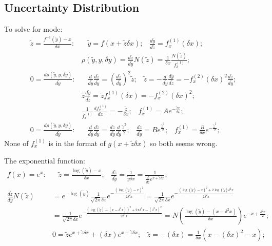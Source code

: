 \documentclass[twoside]{article}
\numberwithin{equation}{section}
\newcommand{\eqspace}{\;\;\;}
\begin{document}
\subsection{Uncertainty Distribution}

\iffalse

To solve for mode:
\begin{align*}
\tilde{z} = \frac{f^{-1}(\tilde{y}) - x}{\delta x}:& \eqspace 
 \tilde{y} = f(x + \tilde{z} \delta x); \eqspace
 \frac{d \tilde{y}}{d \tilde{z}} = f_x^{(1)} (\delta x); \\
& \rho(\tilde{y}, y, \delta y) = \frac{d \tilde{z}}{d \tilde{y}} N(\tilde{z})
 = \frac{1}{\delta x} \frac{N(\tilde{z})}{f_x^{(1)}};  \\
0 = \frac{d \rho(\tilde{y}, y, \delta y)}{d \tilde{y}}: & \eqspace
 \frac{d}{d \tilde{y}} \frac{d \tilde{z}}{d \tilde{y}} = (\frac{d \tilde{z}}{d \tilde{y}})^2 \tilde{z}; \eqspace
 \tilde{z} = - \frac{d}{d \tilde{y}} \frac{d \tilde{y}}{d \tilde{z}}
  = - f_x^{(2)} (\delta x)^2 \frac{d \tilde{z}}{d \tilde{y}}; \\
& \tilde{z} \frac{d \tilde{y}}{d \tilde{z}} = \tilde{z} f_x^{(1)} (\delta x) = - f_x^{(2)} (\delta x)^2; \\
& \frac{1}{f_x^{(1)}} \frac{d f_x^{(1)}}{dx} = - \frac{\tilde{z}}{\delta x}; \eqspace 
 f_x^{(1)} = A e^{- \frac{\tilde{z} x}{\delta x}}; \\
0 = \frac{d \rho(\tilde{y}, y, \delta y)}{d \tilde{y}}:& \eqspace \frac{d}{d \tilde{y}} \frac{d \tilde{z}}{d \tilde{y}}
   = \frac{d \tilde{z}}{d \tilde{y}} \frac{d}{d \tilde{y}} \frac{\tilde{z}^2}{2}; \eqspace
 \frac{d \tilde{z}}{d \tilde{y}} = B e^{\frac{\tilde{z}^2}{2}}; \eqspace
 f_x^{(1)} = \frac{B}{\delta x} e^{-\frac{\tilde{z}^2}{2}};
\end{align*}
None of $f_x^{(1)}$ is in the format of $g(x + \tilde{z} \delta x)$ so both seems wrong.

The exponential function:
\begin{align*}
f(x) = e^x:& \eqspace 
\tilde{z} = \frac{\log(\tilde{y}) - x}{\delta x}, \eqspace 
\frac{d \tilde{z}}{d \tilde{y}} = \frac{1}{\tilde{y} \delta x} = \frac{1}{\frac{d}{d \tilde{z}} e^{x + \tilde{z} \delta x}}; \eqspace \\
\frac{d \tilde{z}}{d \tilde{y}} N(\tilde{z})
&= e^{-\log(\tilde{y})} \frac{1}{\sqrt{2\pi} \delta x} e^{-\frac{(\log(\tilde{y}) - x)^2}{2 \delta^2 x}}
 = \frac{1}{\sqrt{2\pi} \delta x} e^{-\frac{(\log(\tilde{y}) - x)^2 + 2 \log(\tilde{y}) \delta^2 x }{2 \delta^2 x}} \\
& = \frac{1}{\sqrt{2\pi} \delta x} e^{-\frac{(\log(\tilde{y}) - (x - \delta^2 x))^2 + 2 x \delta^2 x - (\delta^2 x)^2 }{2 \delta^2 x}}
 = N(\frac{\log(\tilde{y}) - (x - \delta^2 x)}{\delta x}) e^{-x + \frac{\delta^2 x}{2}}; \\
& 0 = \tilde{z} e^{x + \tilde{z} \delta x} + (\delta x) e^{x + \tilde{z} \delta x}; \eqspace
 \tilde{z} = -(\delta x) = \frac{1}{\delta x}(x - (\delta x)^2 - x);
\end{align*}
\end{document}

